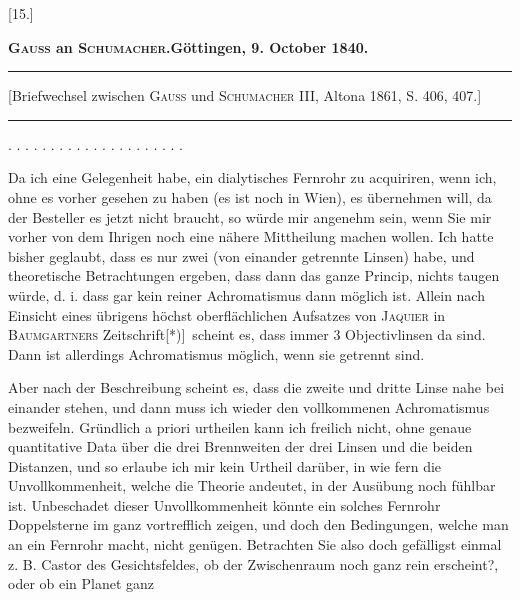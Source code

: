 \clearpage\begingroup
{}

\begin{center}
[15.]\par\medskip
\textbf{\textsc{Gauss} an \textsc{Schumacher}.\quad Göttingen, 9. October 1840.}\par\medskip
\rule{.84\linewidth}{.4pt}\par\smallskip
{\footnotesize [Briefwechsel zwischen \textsc{Gauss} und \textsc{Schumacher} III, Altona 1861, S. 406, 407.]}\par\smallskip
\rule{.84\linewidth}{.4pt}
\end{center}
\noindent . . . . . . . . . . . . . . . . . . . . .\par
\noindent\hspace*{\parindent}Da ich eine Gelegenheit habe, ein dialytisches Fernrohr zu acquiriren, wenn ich, ohne es vorher gesehen zu haben (es ist noch in Wien), es übernehmen will, da der Besteller es jetzt nicht braucht, so würde mir angenehm sein, wenn Sie mir vorher von dem Ihrigen noch eine nähere Mittheilung machen wollen. Ich hatte bisher geglaubt, dass es nur zwei (von einander getrennte Linsen) habe, und theoretische Betrachtungen ergeben, dass dann das ganze Princip, nichts taugen würde, d. i. dass gar kein reiner Achromatismus dann möglich ist. Allein nach Einsicht eines übrigens höchst oberflächlichen Aufsatzes von \textsc{Jaquier} in \textsc{Baumgartners} Zeitschrift[*)]\begingroup\renewcommand{\thefootnote}{}\endgroup\ scheint es, dass immer 3 Objectivlinsen da sind. Dann ist allerdings Achromatismus möglich, wenn sie  getrennt sind.
\begin{center}\DioptrikLetterFifteenDiagram\end{center}
\noindent\hspace*{\parindent}Aber nach der Beschreibung scheint es, dass die zweite und dritte Linse nahe bei einander stehen, und dann muss ich wieder den vollkommenen Achromatismus bezweifeln. Gründlich a priori urtheilen kann ich freilich nicht, ohne genaue quantitative Data über die drei Brennweiten der drei Linsen und die beiden Distanzen, und so erlaube ich mir kein Urtheil darüber, in wie fern die Unvollkommenheit, welche die Theorie andeutet, in der Ausübung noch fühlbar ist. Unbeschadet dieser Unvollkommenheit könnte ein solches Fernrohr Doppelsterne im  ganz vortrefflich zeigen, und doch den  Bedingungen, welche man an ein Fernrohr macht, nicht genügen. Betrachten Sie also doch gefälligst einmal z. B. Castor  des Gesichtsfeldes, ob der Zwischenraum noch ganz rein erscheint?, oder ob ein Planet  ganz
